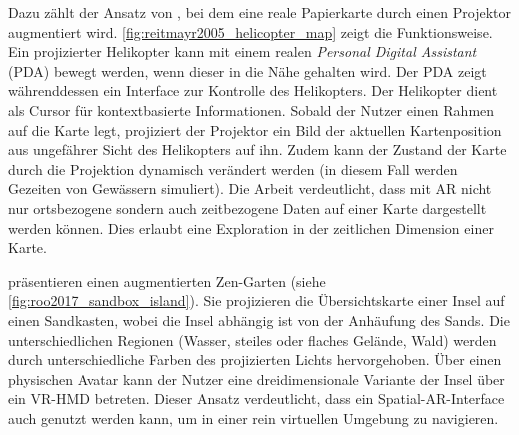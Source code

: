 Dazu zählt der Ansatz von \textcite{Reitmayr2005}, bei dem eine reale Papierkarte durch einen Projektor augmentiert wird.
\autoref{fig:reitmayr2005_helicopter_map} zeigt die Funktionsweise.
Ein projizierter Helikopter kann mit einem realen \emph{Personal Digital Assistant} (PDA) bewegt werden, wenn dieser in die Nähe gehalten wird.
Der PDA zeigt währenddessen ein Interface zur Kontrolle des Helikopters.
Der Helikopter dient als Cursor für kontextbasierte Informationen.
Sobald der Nutzer einen Rahmen auf die Karte legt, projiziert der Projektor ein Bild der aktuellen Kartenposition aus ungefährer Sicht des Helikopters auf ihn.
Zudem kann der Zustand der Karte durch die Projektion dynamisch verändert werden (in diesem Fall werden Gezeiten von Gewässern simuliert).
Die Arbeit verdeutlicht, dass mit AR nicht nur ortsbezogene sondern auch zeitbezogene Daten auf einer Karte dargestellt werden können.
Dies erlaubt eine Exploration in der zeitlichen Dimension einer Karte.

\textcite{Roo2017} präsentieren einen augmentierten Zen-Garten (siehe \autoref{fig:roo2017_sandbox_island}).
Sie projizieren die Übersichtskarte einer Insel auf einen Sandkasten, wobei die Insel abhängig ist von der Anhäufung des Sands.
Die unterschiedlichen Regionen (Wasser, steiles oder flaches Gelände, Wald) werden durch unterschiedliche Farben des projizierten Lichts hervorgehoben.
Über einen physischen Avatar kann der Nutzer eine dreidimensionale Variante der Insel über ein VR-HMD betreten.
Dieser Ansatz verdeutlicht, dass ein Spatial-AR-Interface auch genutzt werden kann, um in einer rein virtuellen Umgebung zu navigieren.

